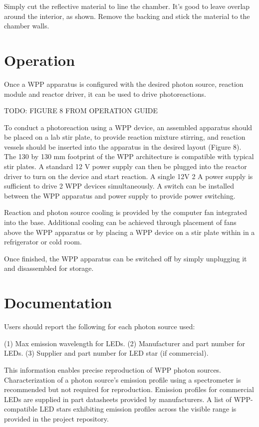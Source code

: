 \documentclass[11pt]{article}
\let\stdsection\section
\renewcommand\section{\clearpage\stdsection}
\begin{document}
Simply cut the reflective material to line the chamber.
It's good to leave overlap around the interior, as shown.
Remove the backing and stick the material to the chamber walls.

\section{Operation}

Once a WPP apparatus is configured with the desired photon source, reaction module and reactor driver, it can be used to drive photoreactions.

TODO: FIGURE 8 FROM OPERATION GUIDE

To conduct a photoreaction using a WPP device, an assembled apparatus should be placed on a lab stir plate, to provide reaction mixture stirring, and reaction vessels should be inserted into the apparatus in the desired layout (Figure 8).
The 130 by 130 mm footprint of the WPP architecture is compatible with typical stir plates.
A standard 12 V power supply can then be plugged into the reactor driver to turn on the device and start reaction.
A single 12V 2 A power supply is sufficient to drive 2 WPP devices simultaneously.
A switch can be installed between the WPP apparatus and power supply to provide power switching.

Reaction and photon source cooling is provided by the computer fan integrated into the base.
Additional cooling can be achieved through placement of fans above the WPP apparatus or by placing a WPP device on a stir plate within in a refrigerator or cold room.

Once finished, the WPP apparatus can be switched off by simply unplugging it and disassembled for storage.

\section{Documentation}

Users should report the following for each photon source used:

    (1) Max emission wavelength for LEDs.
    (2) Manufacturer and part number for LEDs.
    (3) Supplier and part number for LED star (if commercial).

This information enables precise reproduction of WPP photon sources. Characterization of a photon source’s emission profile using a spectrometer is recommended but not required for reproduction. Emission profiles for commercial LEDs are supplied in part datasheets provided by manufacturers. A list of WPP-compatible LED stars exhibiting emission profiles across the visible range is provided in the project repository.
\end{document}
